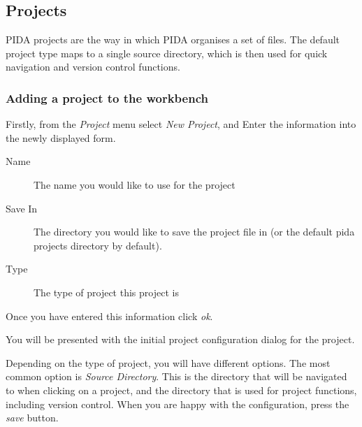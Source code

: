 \documentclass[10pt,a4paper,english]{article}
\begin{document}

\hypertarget{projects}{}
\subsection*{Projects}

PIDA projects are the way in which PIDA organises a set of files. The default
project type maps to a single source directory, which is then used for quick
navigation and version control functions.



\hypertarget{adding-a-project-to-the-workbench}{}
\subsubsection*{Adding a project to the workbench}

Firstly, from the \emph{Project} menu select \emph{New Project}, and Enter the
information into the newly displayed form.
\begin{description}
\item[Name] %

The name you would like to use for the project

\item[Save In] %

The directory you would like to save the project file in (or the default
pida projects directory by default).

\item[Type] %

The type of project this project is

\end{description}

Once you have entered this information click \emph{ok}.

You will be presented with the initial project configuration dialog for the
project.

Depending on the type of project, you will have different options. The most
common option is \emph{Source Directory}. This is the directory that will be
navigated to when clicking on a project, and the directory that is used for
project functions, including version control. When you are happy with the
configuration, press the \emph{save} button.
\end{document}

